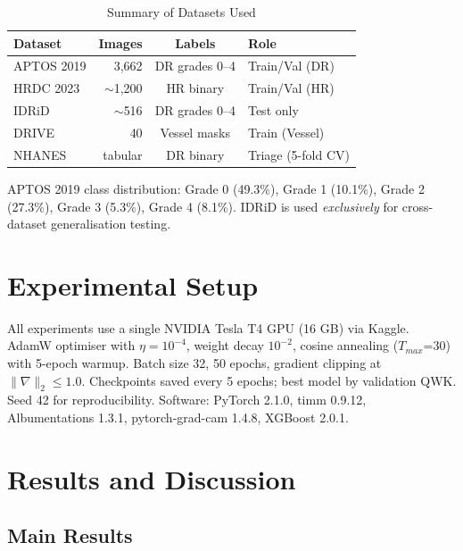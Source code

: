 \documentclass[conference]{IEEEtran}
\begin{document}
\begin{table}[htbp]
\caption{Summary of Datasets Used}
\centering
\begin{tabular}{lrcl}
\toprule
\textbf{Dataset} & \textbf{Images} & \textbf{Labels} & \textbf{Role} \\
\midrule
APTOS 2019 & 3,662 & DR grades 0--4 & Train/Val (DR) \\
HRDC 2023 & $\sim$1,200 & HR binary & Train/Val (HR) \\
IDRiD & $\sim$516 & DR grades 0--4 & Test only \\
DRIVE & 40 & Vessel masks & Train (Vessel) \\
NHANES & tabular & DR binary & Triage (5-fold CV) \\
\bottomrule
\end{tabular}
\label{tab:datasets}
\end{table}

APTOS 2019 class distribution: Grade 0 (49.3\%), Grade 1 (10.1\%), Grade 2 (27.3\%), Grade 3 (5.3\%), Grade 4 (8.1\%). IDRiD is used \textit{exclusively} for cross-dataset generalisation testing.

\section{Experimental Setup}

All experiments use a single NVIDIA Tesla T4 GPU (16 GB) via Kaggle. AdamW optimiser with $\eta = 10^{-4}$, weight decay $10^{-2}$, cosine annealing ($T_{max}$=30) with 5-epoch warmup. Batch size 32, 50 epochs, gradient clipping at $\|\nabla\|_2 \leq 1.0$. Checkpoints saved every 5 epochs; best model by validation QWK. Seed 42 for reproducibility. Software: PyTorch 2.1.0, timm 0.9.12, Albumentations 1.3.1, pytorch-grad-cam 1.4.8, XGBoost 2.0.1.

\section{Results and Discussion}

\subsection{Main Results}
\end{document}
